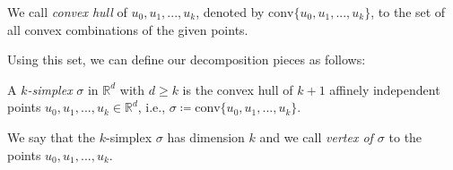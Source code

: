\documentclass[../main.tex]{subfiles}
\begin{document}
\begin{definition}
\begin{sloppypar}
We call \emph{convex hull} of $u_0, u_1, ..., u_k$, denoted by ${\text{conv}\{u_0, u_1, ..., u_k\}}$, to the set of all convex combinations of the given points.
\end{sloppypar}
\end{definition}
Using this set, we can define our decomposition pieces as follows:

\begin{definition}
A \emph{$k$\textit{-simplex}} $\sigma$ in $\mathbb{R}^d$ with $d \geq k$ is the convex hull of $k+1$ affinely independent points $u_0, u_1, ..., u_k \in \mathbb{R}^d$, i.e.,
$\sigma \coloneqq \text{conv}\{u_0, u_1, ..., u_k\}$.
\end{definition}

We say that the $k$-simplex $\sigma$ has dimension $k$ and we call \emph{vertex of $\sigma$} to the points $u_0, u_1, ..., u_k$.
\end{document}
